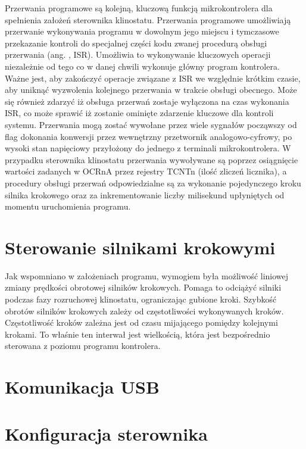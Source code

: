 Przerwania programowe są kolejną, kluczową funkcją mikrokontrolera dla spełnienia założeń sterownika klinostatu. Przerwania programowe umożliwiają przerwanie wykonywania programu w dowolnym jego miejscu i tymczasowe przekazanie kontroli do specjalnej części kodu zwanej procedurą obsługi przerwania (ang. , ISR). Umożliwia to wykonywanie kluczowych operacji niezależnie od tego co w danej chwili wykonuje główny program kontrolera. Ważne jest, aby zakończyć operacje związane z ISR we względnie krótkim czasie, aby uniknąć wyzwolenia kolejnego przerwania w trakcie obsługi obecnego. Może się również zdarzyć iż obsługa przerwań zostaje wyłączona na czas wykonania ISR, co może sprawić iż zostanie ominięte zdarzenie kluczowe dla kontroli systemu. Przerwania mogą zostać wywołane przez wiele sygnałów począwszy od flag dokonania konwersji przez wewnętrzny przetwornik analogowo-cyfrowy, po wysoki stan napięciowy przyłożony do jednego z terminali mikrokontrolera. W przypadku sterownika klinostatu przerwania wywoływane są poprzez osiągnięcie wartości zadanych w OCRnA przez rejestry TCNTn (ilość zliczeń licznika), a procedury obsługi przerwań odpowiedzialne są za wykonanie pojedynczego kroku silnika krokowego oraz za inkrementowanie liczby milisekund upłyniętych od momentu uruchomienia programu.

\section{Sterowanie silnikami krokowymi}

Jak wspomniano w założeniach programu, wymogiem była możliwość liniowej zmiany prędkości obrotowej silników krokowych. Pomaga to odciążyć silniki podczas fazy rozruchowej klinostatu, ograniczając gubione kroki. Szybkość obrotów silników krokowych zależy od częstotliwości wykonywanych kroków. Częstotliwość kroków zależna jest od czasu mijającego pomiędzy kolejnymi krokami. To właśnie ten interwał jest wielkością, która jest bezpośrednio sterowana z poziomu programu kontrolera.

\section{Komunikacja USB}

\section{Konfiguracja sterownika}